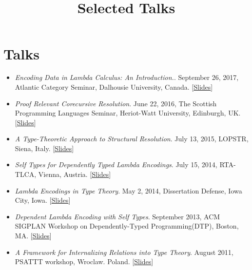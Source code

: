 \documentclass[10pt]{article}
\title{\bfseries\Large Selected Talks}
\date{}
\begin{document}
\maketitle
\vspace{-4em}

\vspace{20pt}
\section*{Talks}
\begin{itemize}

\item \textit{Encoding Data in Lambda Calculus: An Introduction.}. September 26, 2017, Atlantic Category Seminar, Dalhousie University, Canada. [\href{../../document/talks/lam.pdf}{Slides}]
  
\item \textit{Proof Relevant Corecursive Resolution}. June 22, 2016, The Scottish Programming Languages Seminar, Heriot-Watt University, Edinburgh, UK. [\href{../../document/talks/spls-2016.pdf}{Slides}]

\item \textit{A Type-Theoretic Approach to Structural Resolution}. July 13, 2015, LOPSTR, Siena, Italy. [\href{../../document/talks/lopstr-2015.pdf}{Slides}]

\item \textit{Self Types for Dependently Typed Lambda Encodings}. July 15, 2014, RTA-TLCA, Vienna, Austria. [\href{../../document/talks/rta-tlca-14.pdf}{Slides}]
\item \textit{Lambda Encodings in Type Theory}. May 2, 2014, Dissertation Defense, Iowa City, Iowa. [\href{../../document/talks/thesis-talk.pdf}{Slides}]
\item \textit{Dependent Lambda Encoding with Self Types}. September 2013, ACM SIGPLAN Workshop on Dependently-Typed Programming(DTP), Boston, MA. [\href{../../document/talks/dtp-2013.pdf}{Slides}]

\item \textit{A Framework for Internalizing Relations into Type Theory}. August 2011, PSATTT workshop, Wroclaw. Poland. [\href{../../document/talks/psattt11-talk.pdf}{Slides}]
\end{itemize}
\end{document}
